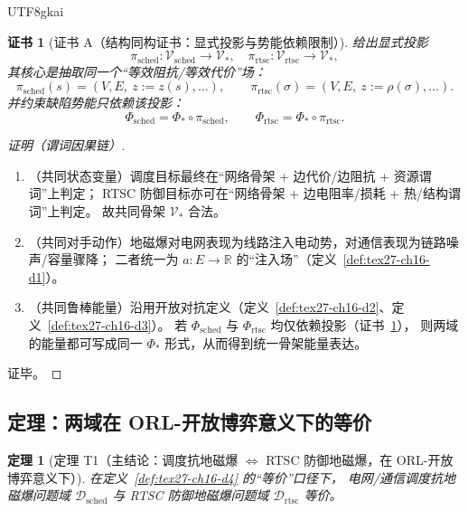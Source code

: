 \documentclass[12pt]{article}
\newtheorem{theorem}{定理}[section]
\newtheorem{Certificate}{证书}[section]
\newcommand{\RR}{\mathbb{R}}
\begin{document}
\begin{CJK*}{UTF8}{gkai}
\begin{Certificate}[证书 A（结构同构证书：显式投影与势能依赖限制）]
\label{cert:tex27-ch16-a}
给出显式投影
\[
  \pi_{\mathrm{sched}}:\mathcal{V}_{\mathrm{sched}}\to\mathcal{V}_\ast,\quad
  \pi_{\mathrm{rtsc}}:\mathcal{V}_{\mathrm{rtsc}}\to\mathcal{V}_\ast,
\]
其核心是抽取同一个“等效阻抗/等效代价”场：
\[
  \pi_{\mathrm{sched}}(s)=(V,E,\ z:=z(s),\dots),\qquad
  \pi_{\mathrm{rtsc}}(\sigma)=(V,E,\ z:=\rho(\sigma),\dots).
\]
并约束缺陷势能只依赖该投影：
\[
  \Phi_{\mathrm{sched}}=\Phi_\ast\circ \pi_{\mathrm{sched}},\qquad
  \Phi_{\mathrm{rtsc}}=\Phi_\ast\circ \pi_{\mathrm{rtsc}}.
\]
\end{Certificate}

\begin{proof}[证明（谓词因果链）]
\begin{enumerate}
  \item（共同状态变量）调度目标最终在“网络骨架 + 边代价/边阻抗 + 资源谓词”上判定；
  RTSC 防御目标亦可在“网络骨架 + 边电阻率/损耗 + 热/结构谓词”上判定。
  故共同骨架 $\mathcal{V}_\ast$ 合法。
  \item（共同对手动作）地磁爆对电网表现为线路注入电动势，对通信表现为链路噪声/容量骤降；
  二者统一为 $a:E\to\RR$ 的“注入场”（定义~\ref{def:tex27-ch16-d1}）。
  \item（共同鲁棒能量）沿用开放对抗定义（定义~\ref{def:tex27-ch16-d2}、定义~\ref{def:tex27-ch16-d3}）。
  若 $\Phi_{\mathrm{sched}}$ 与 $\Phi_{\mathrm{rtsc}}$ 均仅依赖投影（证书~\ref{cert:tex27-ch16-a}），
  则两域的能量都可写成同一 $\Phi_\ast$ 形式，从而得到统一骨架能量表达。
\end{enumerate}
证毕。
\end{proof}

\subsection{定理：两域在 ORL-开放博弈意义下的等价}
\label{subsec:tex27-ch16-theorem}

\begin{theorem}[定理 T1（主结论：调度抗地磁爆 $\Longleftrightarrow$ RTSC 防御地磁爆，在 ORL-开放博弈意义下）]
\label{thm:tex27-ch16-t1}
在定义~\ref{def:tex27-ch16-d4} 的“等价”口径下，
电网/通信调度抗地磁爆问题域 $\mathcal{D}_{\mathrm{sched}}$ 与 RTSC 防御地磁爆问题域 $\mathcal{D}_{\mathrm{rtsc}}$ 等价。
\end{theorem}


\end{CJK*}
\end{document}
